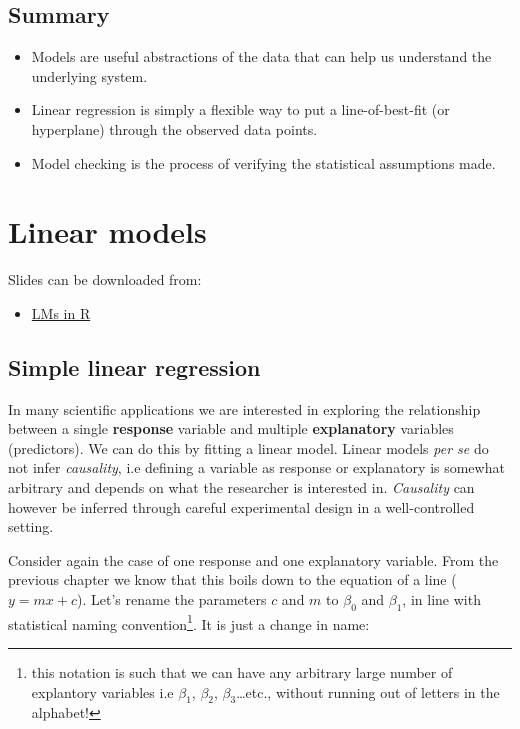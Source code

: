 \documentclass[]{book}
\providecommand{\tightlist}{%
  \setlength{\itemsep}{0pt}\setlength{\parskip}{0pt}}
\let\rmarkdownfootnote\footnote%
\def\footnote{\protect\rmarkdownfootnote}
\theoremstyle{definition}
\theoremstyle{definition}
\theoremstyle{definition}
\theoremstyle{remark}
\begin{document}
\section{Summary}\label{summary}

\begin{itemize}
\tightlist
\item
  Models are useful abstractions of the data that can help us understand
  the underlying system.
\item
  Linear regression is simply a flexible way to put a line-of-best-fit
  (or hyperplane) through the observed data points.
\item
  Model checking is the process of verifying the statistical assumptions
  made.
\end{itemize}

\chapter{Linear models}\label{linear-models}

Slides can be downloaded from:

\begin{itemize}
\tightlist
\item
  \href{https://exeter-data-analytics.github.io/StatModelling/02-linear-models-handout.pdf}{LMs
  in R}
\end{itemize}

\section{Simple linear regression}\label{simple-linear-regression}

In many scientific applications we are interested in exploring the
relationship between a single \textbf{response} variable and multiple
\textbf{explanatory} variables (predictors). We can do this by fitting a
linear model. Linear models \emph{per se} do not infer \emph{causality},
i.e defining a variable as response or explanatory is somewhat arbitrary
and depends on what the researcher is interested in. \emph{Causality}
can however be inferred through careful experimental design in a
well-controlled setting.

Consider again the case of one response and one explanatory variable.
From the previous chapter we know that this boils down to the equation
of a line (\(y = mx +c\)). Let's rename the parameters \(c\) and \(m\)
to \(\beta_0\) and \(\beta_1\), in line with statistical naming
convention\footnote{this notation is such that we can have any arbitrary
  large number of explantory variables i.e \(\beta_1\), \(\beta_2\),
  \(\beta_3\)\ldots{}etc., without running out of letters in the
  alphabet!}. It is just a change in name:
\end{document}
